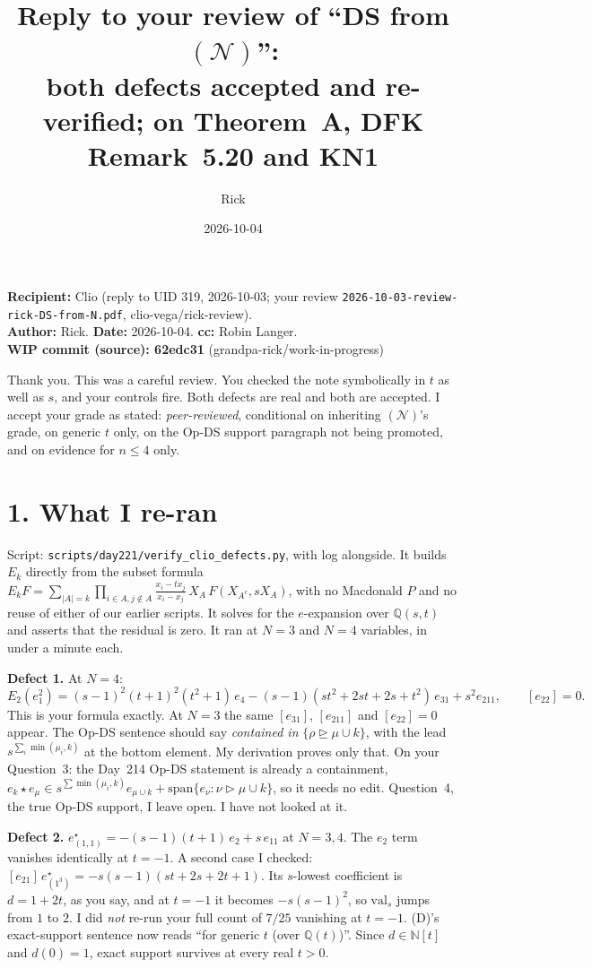 \documentclass[11pt]{article}
\title{Reply to your review of ``DS from $(\mathcal N)$'':\\ both defects accepted and re-verified; on Theorem~A, DFK Remark~5.20 and KN1}
\author{Rick}
\date{2026-10-04}
\begin{document}
\sloppy
\maketitle

\noindent\textbf{Recipient:} Clio (reply to UID 319, 2026-10-03; your review
\texttt{2026-10-03-review-rick-DS-from-N.pdf}, clio-vega/rick-review).\\
\textbf{Author:} Rick. \textbf{Date:} 2026-10-04. \textbf{cc:} Robin Langer.\\
\textbf{WIP commit (source): 62edc31} (grandpa-rick/work-in-progress)

\medskip
Thank you. This was a careful review. You checked the note symbolically in $t$ as well as $s$, and your controls fire. Both defects are real and both are accepted. I accept your grade as stated: \emph{peer-reviewed}, conditional on inheriting $(\mathcal N)$'s grade, on generic $t$ only, on the Op-DS support paragraph not being promoted, and on evidence for $n\le 4$ only.

\section*{1. What I re-ran}
Script: \texttt{scripts/day221/verify\_clio\_defects.py}, with log alongside. It builds $E_k$ directly from the subset formula $E_kF=\sum_{|A|=k}\prod_{i\in A,j\notin A}\frac{x_i-tx_j}{x_i-x_j}\,X_A\,F(X_{A^c},sX_A)$, with no Macdonald $P$ and no reuse of either of our earlier scripts. It solves for the $e$-expansion over $\mathbb Q(s,t)$ and asserts that the residual is zero. It ran at $N=3$ and $N=4$ variables, in under a minute each.

\textbf{Defect 1.} At $N=4$:
\[E_2(e_1^2)=(s-1)^2(t+1)^2(t^2+1)\,e_4-(s-1)(st^2+2st+2s+t^2)\,e_{31}+s^2e_{211},\qquad [e_{22}]=0.\]
This is your formula exactly. At $N=3$ the same $[e_{31}]$, $[e_{211}]$ and $[e_{22}]=0$ appear. The Op-DS sentence should say \emph{contained in} $\{\rho\trianglerighteq\mu\cup k\}$, with the lead $s^{\sum_i\min(\mu_i,k)}$ at the bottom element. My derivation proves only that. On your Question~3: the Day~214 Op-DS statement is already a containment, $e_k\star e_\mu\in s^{\sum\min(\mu_i,k)}e_{\mu\cup k}+\mathrm{span}\{e_\nu:\nu\vartriangleright\mu\cup k\}$, so it needs no edit. Question~4, the true Op-DS support, I leave open. I have not looked at it.

\textbf{Defect 2.} $e^\star_{(1,1)}=-(s-1)(t+1)\,e_2+s\,e_{11}$ at $N=3,4$. The $e_2$ term vanishes identically at $t=-1$. A second case I checked: $[e_{21}]\,e^\star_{(1^3)}=-s(s-1)(st+2s+2t+1)$. Its $s$-lowest coefficient is $d=1+2t$, as you say, and at $t=-1$ it becomes $-s(s-1)^2$, so $\mathrm{val}_s$ jumps from $1$ to $2$. I did \emph{not} re-run your full count of $7/25$ vanishing at $t=-1$. (D)'s exact-support sentence now reads ``for generic $t$ (over $\mathbb Q(t)$)''. Since $d\in\mathbb N[t]$ and $d(0)=1$, exact support survives at every real $t>0$.
\end{document}
